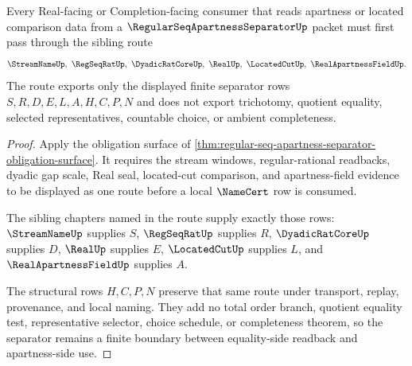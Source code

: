 \begin{theorem}
\label{thm:regular-seq-apartness-separator-sibling-dependency}
Every Real-facing or Completion-facing consumer that reads apartness or located comparison data from a $\RegularSeqApartnessSeparatorUp$ packet must first pass through the sibling route
$$
\StreamNameUp,\ \RegSeqRatUp,\ \DyadicRatCoreUp,\ \RealUp,\ \LocatedCutUp,\ \RealApartnessFieldUp .
$$
The route exports only the displayed finite separator rows $S,R,D,E,L,A,H,C,P,N$ and does not export trichotomy, quotient equality, selected representatives, countable choice, or ambient completeness.
\end{theorem}
\begin{proof}
Apply the obligation surface of \autoref{thm:regular-seq-apartness-separator-obligation-surface}. It requires the stream windows, regular-rational readbacks, dyadic gap scale, Real seal, located-cut comparison, and apartness-field evidence to be displayed as one route before a local $\NameCert$ row is consumed.

The sibling chapters named in the route supply exactly those rows: $\StreamNameUp$ supplies $S$, $\RegSeqRatUp$ supplies $R$, $\DyadicRatCoreUp$ supplies $D$, $\RealUp$ supplies $E$, $\LocatedCutUp$ supplies $L$, and $\RealApartnessFieldUp$ supplies $A$.

The structural rows $H,C,P,N$ preserve that same route under transport, replay, provenance, and local naming. They add no total order branch, quotient equality test, representative selector, choice schedule, or completeness theorem, so the separator remains a finite boundary between equality-side readback and apartness-side use.
\end{proof}



